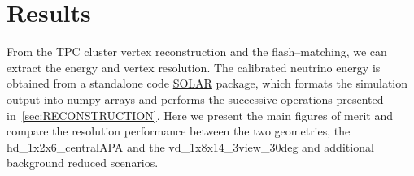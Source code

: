 \section{Results\label{sec:RESULTS}}
From the TPC cluster vertex reconstruction and the flash--matching, we can extract the energy and vertex resolution. The calibrated neutrino energy is obtained from a standalone code \href{https://github.com/CIEMAT-Neutrino/SOLAR}{SOLAR} package, which formats the simulation output into numpy arrays and performs the successive operations presented in~\cref{sec:RECONSTRUCTION}. Here we present the main figures of merit and compare the resolution performance between the two geometries, the hd\_1x2x6\_centralAPA and the vd\_1x8x14\_3view\_30deg and additional background reduced scenarios.






